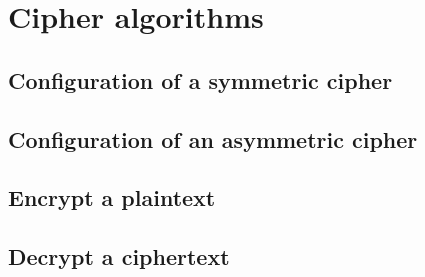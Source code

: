 \chapter{Cipher algorithms}

\section{Configuration of a symmetric cipher}

\section{Configuration of an asymmetric cipher}

\section{Encrypt a plaintext}

\section{Decrypt a ciphertext}
